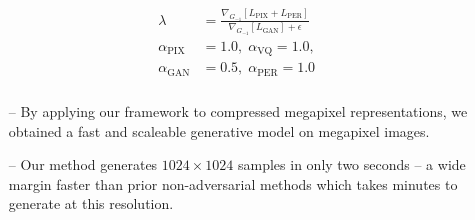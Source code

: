 \documentclass[14pt,margin=0.5in,innermargin=0in,blockverticalspace=-0.1in,colspace=-1.2cm]{tikzposter}
\begin{document}
\begin{columns}
{\begin{tcolorbox}[boxsep=0pt,top=0cm,bottom=0.6cm,adjusted title={\huge\bf Proposed Method},colbacktitle=colorOne]
{\begin{minipage}{0.49\linewidth}
\begin{align*}
            \begin{split}
                \lambda &= \frac{\nabla_{G_{-1}}[L_\text{PIX} +
                L_\text{PER}]}{\nabla_{G_{-1}}[L_\text{GAN}] + \epsilon}\\
                \alpha_\text{PIX} &= 1.0,\; \alpha_\text{VQ} = 1.0,\\
                \alpha_\text{GAN} &= 0.5,\; \alpha_\text{PER} = 1.0 \\
            \end{split}
            \end{align*}
        \end{minipage}
            }
        \vspace{0.4cm}
        {
        \Large
        \begin{itemize}
            \item[--] By applying our framework to compressed megapixel
                representations, we obtained a fast and scaleable generative
                model on megapixel images.
            \item[--] Our method generates $1024 \times 1024$ samples in only
                two seconds -- a wide margin faster than prior non-adversarial
                methods which takes minutes to generate at this resolution.
        \end{itemize}
        }


\end{tcolorbox}}
\end{columns}
\end{document}
